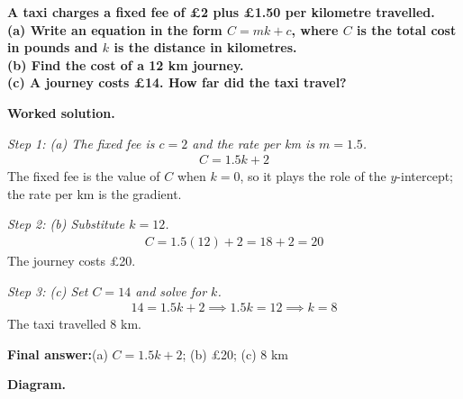 \documentclass[11pt]{article}
\newcommand{\question}[1]{\par\medskip\noindent\textbf{#1}\par}
\begin{document}
\question{A taxi charges a fixed fee of \pounds 2 plus \pounds 1.50 per kilometre travelled. \\[3pt] (a) Write an equation in the form \( C = mk + c \), where \( C \) is the total cost in pounds and \( k \) is the distance in kilometres. \\[3pt] (b) Find the cost of a 12 km journey. \\[3pt] (c) A journey costs \pounds 14. How far did the taxi travel?}

\textbf{Worked solution.}

\textit{Step 1: (a) The fixed fee is \( c = 2 \) and the rate per km is \( m = 1.5 \).}
\[\begin{gathered}
C = 1.5k + 2
\end{gathered}\]
The fixed fee is the value of \(C\) when \(k = 0\), so it plays the role of the \(y\)-intercept; the rate per km is the gradient.

\textit{Step 2: (b) Substitute \( k = 12 \).}
\[\begin{gathered}
C = 1.5(12) + 2 = 18 + 2 = 20
\end{gathered}\]
The journey costs \pounds 20.

\textit{Step 3: (c) Set \( C = 14 \) and solve for \( k \).}
\[\begin{gathered}
14 = 1.5k + 2 \implies 1.5k = 12 \implies k = 8
\end{gathered}\]
The taxi travelled 8 km.

\begin{answerbox}
\textbf{Final answer:}\quad (a) \(\displaystyle C = 1.5k + 2\); (b) \pounds 20; (c) 8 km
\end{answerbox}
\textbf{Diagram.}
\end{document}
